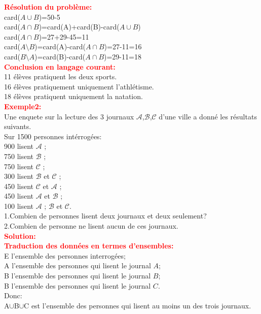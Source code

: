 \documentclass[12pt]{article}
\begin{document}
\textbf{\textcolor{red}{Résolution du problème:}}\\
card($A\cup B$)=50-5\\
card($A\cap B$)=card(A)+card(B)-card($A \cup B$)\\
card($A\cap B$)=27+29-45=11\\
card($A\setminus B$)=card(A)-card($A \cap B$)=27-11=16\\
card($B\setminus A$)=card(B)-card($A \cap B$)=29-11=18\\
\textbf{\textcolor{red}{Conclusion en langage courant:}}\\
11 élèves pratiquent les deux sports.\\
16 élèves pratiquement uniquement l'athlétisme.\\
18 élèves pratiquent uniquement la natation.\\
\textbf{\textcolor{red}{Exemple2:}}\\
Une enquete sur la lecture des 3 journaux $\mathcal{A}$,$\mathcal{B}$,$\mathcal{C}$ d'une ville a donné les résultats suivants.\\
Sur 1500 personnes intérrogées: \\
900 lisent $\mathcal{A}$ ; \\
750 lisent $\mathcal{B}$ ; \\
750 lisent $\mathcal{C}$ ; \\
300 lisent $\mathcal{B}$ et $\mathcal{C}$ ; \\
450 lisent $\mathcal{C}$ et $\mathcal{A}$ ; \\
450 lisent $\mathcal{A}$ et $\mathcal{B}$ ; \\
100 lisent $\mathcal{A}$ ; $\mathcal{B}$ et $\mathcal{C}$.\\
1.Combien de personnes lisent deux journaux et deux seulement?\\
2.Combien de personne ne lisent aucun de ces journaux.\\
\textbf{\textcolor{red}{Solution:}}\\
\textbf{\textcolor{red}{Traduction des données en termes d'ensembles:}}\\
E l'ensemble des personnes interrogées;\\
A l'ensemble des personnes qui lisent le journal $A$;\\
B l'ensemble des personnes qui lisent le journal $B$;\\
B l'ensemble des personnes qui lisent le journal $C$.\\
Donc:\\ A$\cup$B$\cup$C est l'ensemble des personnes qui lisent au moins un des trois journaux.
\end{document}
